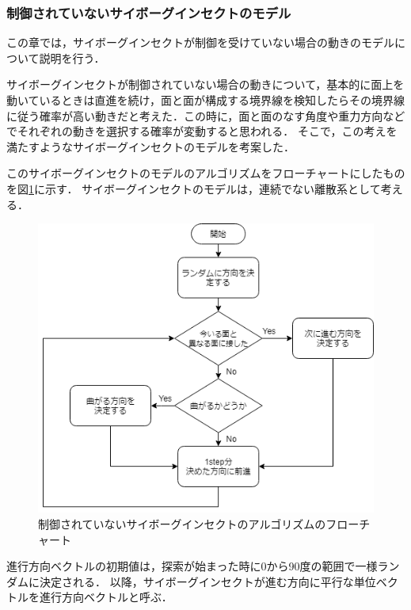 \documentclass[a4paper,11pt]{jarticle}
\begin{document}
	\subsubsection{制御されていないサイボーグインセクトのモデル}
	\label{sec:not_control}
	この章では，サイボーグインセクトが制御を受けていない場合の動きのモデルについて説明を行う．
	
	サイボーグインセクトが制御されていない場合の動きについて，基本的に面上を動いているときは直進を続け，面と面が構成する境界線を検知したらその境界線に従う確率が高い動きだと考えた．この時に，面と面のなす角度や重力方向などでそれぞれの動きを選択する確率が変動すると思われる．
	そこで，この考えを満たすようなサイボーグインセクトのモデルを考案した．
	
	このサイボーグインセクトのモデルのアルゴリズムをフローチャートにしたものを図\ref{fig:algorithm}に示す．
	サイボーグインセクトのモデルは，連続でない離散系として考える．
	
	\begin{figure}
		\centering
		\includegraphics[width=0.7\linewidth]{png/Untitled.png}
		\caption[アルゴリズムのフローチャート]{制御されていないサイボーグインセクトのアルゴリズムのフローチャート}
		\label{fig:algorithm}
	\end{figure}
	
	進行方向ベクトルの初期値は，探索が始まった時に0から90度の範囲で一様ランダムに決定される．
	以降，サイボーグインセクトが進む方向に平行な単位ベクトルを進行方向ベクトルと呼ぶ．
	
\end{document}
